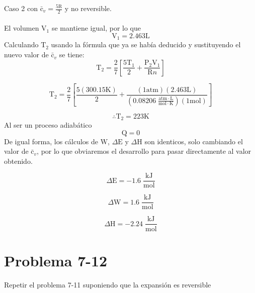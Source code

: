 \documentclass[12pt]{article}
\begin{document}
Caso 2 con $\mathrm{\bar{c}}_v=\frac{5\mathrm{R}}{2}$ y no reversible.\\
\\
El volumen $\mathrm{V}_1$ se mantiene igual, por lo que
\begin{displaymath}
	\mathrm{V}_1=2.463\mathrm{L}
\end{displaymath}
Calculando $\mathrm{T}_2$ usando la fórmula que ya se había deducido y sustituyendo el nuevo valor de $\mathrm{\bar{c}}_v$ se tiene:
\begin{displaymath}
	\mathrm{T}_2=\frac{2}{7}\left[ \frac{5\mathrm{T}_1}{2}+\frac{\mathrm{P}_2\mathrm{V}_1}{\mathrm{R}n} \right]
\end{displaymath}

\begin{displaymath}
	\mathrm{T}_2=\frac{2}{7}\left[ \frac{5(300.15\mathrm{K})}{2} +\frac{(1\mathrm{atm})(2.463\mathrm{L})}{(0.08206\; \frac{\mathrm{atm}\cdot\mathrm{L}}{\mathrm{mol}\cdot\mathrm{K}})(1\mathrm{mol})} \right]
\end{displaymath}

\begin{displaymath}
	\therefore \mathrm{T}_2=223\mathrm{K}
\end{displaymath}
Al ser un proceso adiabático 
\begin{displaymath}
	\mathrm{Q}=0
\end{displaymath}
De igual forma, los cálculos de $\mathrm{W}$, $\Delta\mathrm{E}$ y $\Delta\mathrm{H}$ son identicos, solo cambiando el valor de $\mathrm{\bar{c}}_v$, por lo que obviaremos el desarrollo para pasar directamente al valor obtenido.

\begin{displaymath}
	\Delta\mathrm{E}=-1.6\; \frac{\mathrm{kJ}}{\mathrm{mol}}
\end{displaymath}

\begin{displaymath}
	\Delta\mathrm{W}=1.6\; \frac{\mathrm{kJ}}{\mathrm{mol}}
\end{displaymath}

\begin{displaymath}
	\Delta\mathrm{H}=-2.24\; \frac{\mathrm{kJ}}{\mathrm{mol}}
\end{displaymath}
\newpage
\section*{Problema 7-12}
Repetir el problema 7-11 suponiendo que la expansión es reversible
\end{document}

